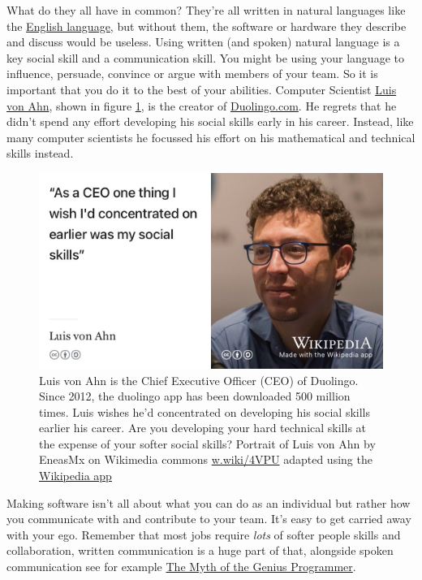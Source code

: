 \documentclass[
]{book}
\begin{document}
What do they all have in common? They're all written in natural languages like the \href{https://en.wikipedia.org/wiki/English_language}{English language}, but without them, the software or hardware they describe and discuss would be useless. Using written (and spoken) natural language is a key social skill and a communication skill. You might be using your language to influence, persuade, convince or argue with members of your team. So it is important that you do it to the best of your abilities. Computer Scientist \href{https://en.wikipedia.org/wiki/Luis_von_Ahn}{Luis von Ahn}, shown in figure \ref{fig:vonahn-fig}, is the creator of \href{https://www.duolingo.com/}{Duolingo.com}. He regrets that he didn't spend any effort developing his social skills early in his career. Instead, like many computer scientists he focussed his effort on his mathematical and technical skills instead. \citep{vonahn}

\begin{figure}

{\centering \includegraphics[width=1\linewidth]{images/luis-von-ahn} 

}

\caption{Luis von Ahn is the Chief Executive Officer (CEO) of Duolingo. Since 2012, the duolingo app has been downloaded 500 million times. Luis wishes he'd concentrated on developing his social skills earlier his career. Are you developing your hard technical skills at the expense of your softer social skills? Portrait of Luis von Ahn by EneasMx on Wikimedia commons \href{https://w.wiki/4VPU}{w.wiki/4VPU} adapted using the \href{https://apps.apple.com/us/app/wikipedia/id324715238}{Wikipedia app}}\label{fig:vonahn-fig}
\end{figure}



Making software isn't all about what you can do as an individual but rather how you communicate with and contribute to your team. It's easy to get carried away with your ego. Remember that most jobs require \emph{lots} of softer people skills and collaboration, written communication is a huge part of that, alongside spoken communication see for example \href{https://www.youtube.com/watch?v=0SARbwvhupQ}{The Myth of the Genius Programmer}. \citep{Fitzpatrick}
\end{document}
